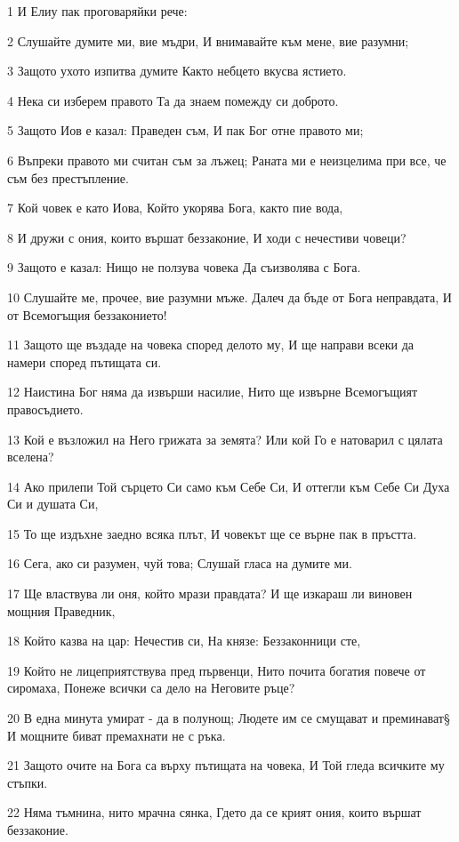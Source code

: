 \par 1 И Елиу пак проговаряйки рече:
\par 2 Слушайте думите ми, вие мъдри, И внимавайте към мене, вие разумни;
\par 3 Защото ухото изпитва думите Както небцето вкусва ястието.
\par 4 Нека си изберем правото Та да знаем помежду си доброто.
\par 5 Защото Иов е казал: Праведен съм, И пак Бог отне правото ми;
\par 6 Въпреки правото ми считан съм за лъжец; Раната ми е неизцелима при все, че съм без престъпление.
\par 7 Кой човек е като Иова, Който укорява Бога, както пие вода,
\par 8 И дружи с ония, които вършат беззаконие, И ходи с нечестиви човеци?
\par 9 Защото е казал: Нищо не ползува човека Да съизволява с Бога.
\par 10 Слушайте ме, прочее, вие разумни мъже. Далеч да бъде от Бога неправдата, И от Всемогъщия беззаконието!
\par 11 Защото ще въздаде на човека според делото му, И ще направи всеки да намери според пътищата си.
\par 12 Наистина Бог няма да извърши насилие, Нито ще извърне Всемогъщият правосъдието.
\par 13 Кой е възложил на Него грижата за земята? Или кой Го е натоварил с цялата вселена?
\par 14 Ако прилепи Той сърцето Си само към Себе Си, И оттегли към Себе Си Духа Си и душата Си,
\par 15 То ще издъхне заедно всяка плът, И човекът ще се върне пак в пръстта.
\par 16 Сега, ако си разумен, чуй това; Слушай гласа на думите ми.
\par 17 Ще властвува ли оня, който мрази правдата? И ще изкараш ли виновен мощния Праведник,
\par 18 Който казва на цар: Нечестив си, На князе: Беззаконници сте,
\par 19 Който не лицеприятствува пред първенци, Нито почита богатия повече от сиромаха, Понеже всички са дело на Неговите ръце?
\par 20 В една минута умират - да в полунощ; Людете им се смущават и преминават§ И мощните биват премахнати не с ръка.
\par 21 Защото очите на Бога са върху пътищата на човека, И Той гледа всичките му стъпки.
\par 22 Няма тъмнина, нито мрачна сянка, Гдето да се крият ония, които вършат беззаконие.
